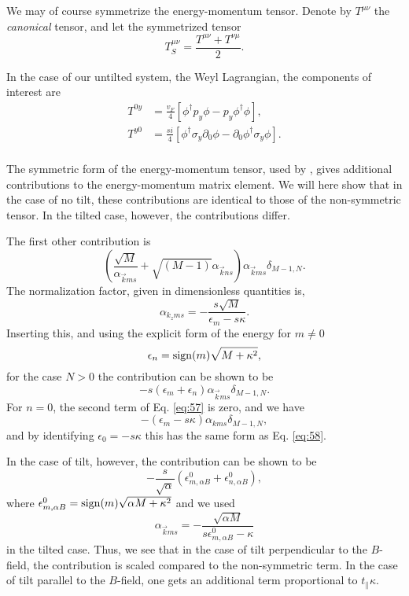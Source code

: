 We may of course symmetrize the energy-momentum tensor.
Denote by \( T^{\mu \nu } \) the \emph{canonical} tensor, and let the symmetrized tensor
\begin{equation}
  \label{eq:symstress}
  T_S^{\mu \nu} = \frac{T^{\mu \nu} + T^{\nu \mu}}{2}.
\end{equation}

In the case of our untilted system, the Weyl Lagrangian, the components of interest are
\begin{align}
  \label{eq:56}
  T^{0 y} &= \frac{v_F}{4}
  \left[
  \phi^{\dagger} p_y \phi - p_y \phi^{\dagger} \phi
  \right],\\
  T^{y 0} &= \frac{s i}{4}
  \left[
  \phi^{\dagger} \sigma_y \partial_{0} \phi - \partial_0 \phi^{\dagger} \sigma_y \phi
  \right].\\
\end{align}


The symmetric form of the energy-momentum tensor, used by \citeauthor{arjonaFingerprintsConformalAnomaly2019}, gives additional contributions to the energy-momentum matrix element.
We will here show that in the case of no tilt, these contributions are identical to those of the non-symmetric tensor.
In the tilted case, however, the contributions differ.

The first other contribution is
\begin{equation}
  \label{eq:57}
  \left(\frac{\sqrt{M}}{\alpha_{\vec{k} m s}} + \sqrt{(M-1)} \alpha_{\vec{k} n s}\right) \alpha_{\vec{k} m s} \delta_{M-1, N}.
\end{equation}
The normalization factor, given in dimensionless quantities is,
\[
\alpha_{k_z m s} = - \frac{s \sqrt{M}}{\epsilon_{m} - s \kappa}.
\]
Inserting this, and using the explicit form of the energy for \( m \neq 0 \)
\[
\epsilon_n = \operatorname{sign}(m) \sqrt{M + \kappa^2},
\]
for the case \( N > 0 \) the contribution can be shown to be
\begin{equation}
  \label{eq:58}
  -s (\epsilon_m + \epsilon_n)\alpha_{\vec{k} m s} \delta_{M-1, N}.
\end{equation}
For \( n = 0 \), the second term of Eq. \eqref{eq:57} is zero, and we have
\begin{equation}
  \label{eq:59}
  -(\epsilon_m - s \kappa) \alpha_{k m s} \delta_{M-1, N},
\end{equation}
and by identifying \( \epsilon_0 = - s \kappa \) this has the same form as Eq. \eqref{eq:58}.

In the case of tilt, however, the contribution can be shown to be
\begin{equation}
  \label{eq:60}
  -\frac{s}{\sqrt{\alpha}} (\epsilon_{m, \alpha B}^0 + \epsilon_{n, \alpha B}^0),
\end{equation}
where \( \epsilon_{m, \alpha B}^0 = \operatorname{sign}(m) \sqrt{\alpha M + \kappa^2}  \) and we used
\[
\alpha_{\vec{k} m s} = - \frac{\sqrt{\alpha M}}{s \epsilon^{0}_{m, \alpha B} - \kappa}
\]
in the tilted case.
Thus, we see that in the case of tilt perpendicular to the \( B \)-field, the contribution is scaled compared to the non-symmetric term.
In the case of tilt parallel to the \( B \)-field, one gets an additional term proportional to \( t_{\parallel} \kappa \).

